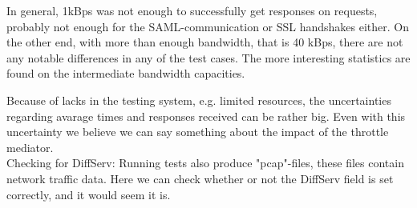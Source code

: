    In general, 1kBps was not enough to successfully get responses on requests, probably not enough for the SAML-communication or SSL handshakes either. On the other end, with more than enough bandwidth, that is 40 kBps, there are not any notable differences in any of the test cases. The more interesting statistics are found on the intermediate bandwidth capacities.

    Because of lacks in the testing system, e.g. limited resources, the uncertainties regarding avarage times and responses received can be rather big. Even with this uncertainty we believe we can say something about the impact of the throttle mediator. \\

    Checking for DiffServ: Running tests also produce "pcap"-files, these files contain network traffic data. Here we can check whether or not the DiffServ field is set correctly, and it would seem it is. 
